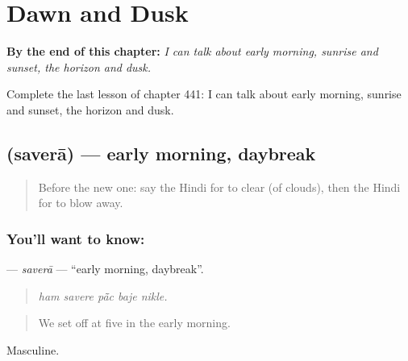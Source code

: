 
\chapter{Dawn and Dusk}
\label{ch:hi-dawn-and-dusk}

\begin{chapteropening}
\textbf{By the end of this chapter:} \emph{I can talk about early morning, sunrise and sunset, the horizon and dusk.}

Complete the last lesson of chapter 441: I can talk about early morning, sunrise and sunset, the horizon and dusk.
\end{chapteropening}

\section[\texorpdfstring{\hi{सवेरा} (saverā)}{सवेरा (saverā)}]{ (saverā) — early morning, daybreak}

\label{lesson:HI-C441-savera}



\begin{quote}
Before the new one: say the Hindi for to clear (of clouds), then the Hindi for to blow away.
\end{quote}

\subsection*{You'll want to know: }
\textbf{} — \emph{saverā} — \textquotedblleft{}early morning, daybreak\textquotedblright{}.

\begin{quote}
    
\end{quote}

\begin{quote}
\emph{ham savere pā̃c baje nikle.}
\end{quote}

\begin{quote}
We set off at five in the early morning.
\end{quote}

Masculine.

